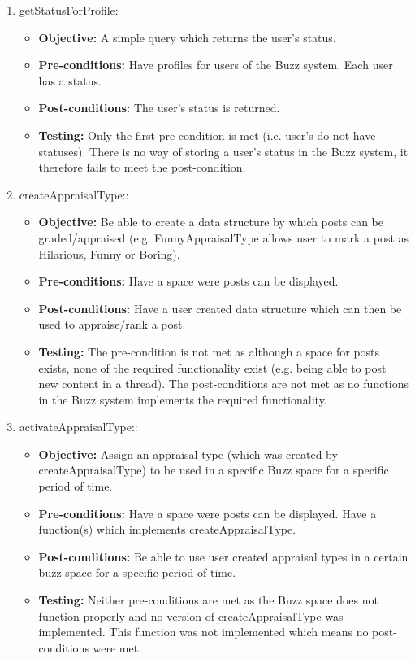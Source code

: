 \begin{enumerate}
\begin{itemize}
	\end{itemize}
\item getStatusForProfile:
	\begin{itemize}
		\item\textbf{Objective: } A simple query which returns the user’s status.
		\item\textbf{Pre-conditions: } Have profiles for users of the Buzz system. Each user has a status.
		\item\textbf{Post-conditions: } The user’s status is returned.
		\item\textbf{Testing: } Only the first pre-condition is met (i.e. user’s do not have statuses). There is no way of storing a user’s status in the Buzz system, it therefore fails to meet the post-condition.
	\end{itemize}
\item createAppraisalType::
	\begin{itemize}
		\item\textbf{Objective: }  Be able to create a data structure by which posts can be graded/appraised (e.g. FunnyAppraisalType allows user to mark a post as Hilarious, Funny or Boring).
		\item\textbf{Pre-conditions: } Have a space were posts can be displayed.
		\item\textbf{Post-conditions: }Have a user created data structure which can then be used to appraise/rank a post.
		\item\textbf{Testing: } The pre-condition is not met as although a space for posts exists, none of the required functionality exist (e.g. being able to post new content in a thread). The post-conditions are not met as no functions in the Buzz system implements the required functionality.
	\end{itemize}
\item activateAppraisalType::
	\begin{itemize}
		\item\textbf{Objective: } Assign an appraisal type (which was created by createAppraisalType) to be used in a specific Buzz space for a specific period of time.
		\item\textbf{Pre-conditions: }  Have a space were posts can be displayed. Have a function(s) which implements createAppraisalType.
		\item\textbf{Post-conditions: }Be able to use user created appraisal types in a certain buzz space for a specific period of time.
		\item\textbf{Testing: }  Neither pre-conditions are met as the Buzz space does not function properly and no version of createAppraisalType was implemented. This function was not implemented which means no post-conditions were met.

\end{itemize}
\end{enumerate}
